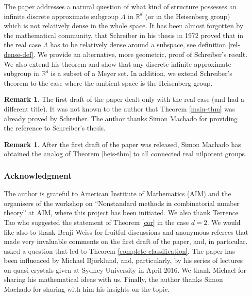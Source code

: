 \documentclass[JEP,XML,SOM,Unicode,NoEqCountersInSection]{cedram}
\newcommand{\bR}{\mathbb{R}}
\newcounter{dummy} \numberwithin{dummy}{section}
\theoremstyle{plain}
\theoremstyle{definition}
\newtheorem{remark}[dummy]{Remark}
\begin{document}
The paper addresses a natural question of what kind of structure possesses an infinite discrete approximate subgroup $\Lambda$ in $\bR^d$ (or in the Heisenberg group) which is not relatively dense in the whole space. It has been almost forgotten by the mathematical community, that Schreiber in his thesis in 1972 \cite{S} proved that
in the real case $\Lambda$ has to be relatively dense around a subspace, see definition \ref{rel-dense-def}. We provide an alternative, more geometric, proof of Schreiber's result. We also extend his theorem and show that any discrete infinite approximate subgroup in $\bR^d$ is a subset of a Meyer set. In addition, we extend Schreiber's theorem to the case where the ambient space is the Heisenberg group.

\begin{remark}
The first draft of the paper dealt only with the real case (and had a different title). It was not known to the author that Theorem \ref{main-thm} was already proved by Schreiber. The author thanks Simon Machado for providing the reference to Schreiber's thesis.
\end{remark}

\begin{remark} After the first draft of the paper was released, Simon Machado has obtained the analog of Theorem \ref{heis-thm} to all connected real nilpotent groups.
\end{remark}

\subsubsection*{Acknowledgment}
The author is grateful to American Institute of Mathematics (AIM) and the organisers of the workshop on ``Nonstandard methods in combinatorial number theory'' at AIM, where this project has been initiated. We also thank Terrence Tao who suggested the statement of Theorem \ref{cor} in the case $d = 2$. We would like also to thank Benji Weiss for fruitful discussions and anonymous referees that made very invaluable comments on the first draft of the paper, and, in particular, asked a question that led to Theorem \ref{complete-classification}. The paper has been influenced by Michael Björklund, and, particularly, by his series of lectures on quasi-crystals given at Sydney University in April 2016. We thank Michael for sharing his mathematical ideas with us. Finally, the author thanks Simon Machado for sharing with him his insights on the topic.
\end{document}
